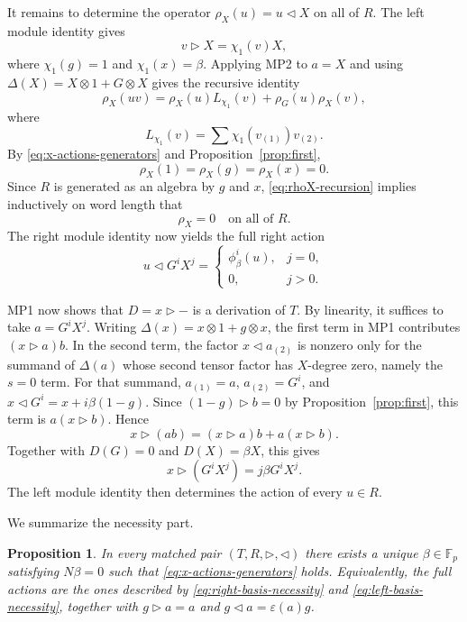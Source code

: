 \documentclass[twoside,11pt]{amsart}
\newtheorem{pro}[defi]{Proposition}
\newcommand{\F}{\mathbb{F}}
\begin{document}
	It remains to determine the operator
	$\rho_X(u)=u\triangleleft X$ on all of $R$. The left module identity gives
	\[
	v\triangleright X=\chi_1(v)X,
	\]
	where $\chi_1(g)=1$ and $\chi_1(x)=\beta$. Applying MP2 to $a=X$ and using
	$\Delta(X)=X\otimes1+G\otimes X$ gives the recursive identity
	\begin{equation}\label{eq:rhoX-recursion}
		\rho_X(uv)
		=\rho_X(u)L_{\chi_1}(v)+\rho_G(u)\rho_X(v),
	\end{equation}
	where
	\[
	L_{\chi_1}(v)=\sum\chi_1(v_{(1)})v_{(2)}.
	\]
	By \eqref{eq:x-actions-generators} and Proposition~\ref{prop:first},
	\[
	\rho_X(1)=\rho_X(g)=\rho_X(x)=0.
	\]
	Since $R$ is generated as an algebra by $g$ and $x$,
	\eqref{eq:rhoX-recursion} implies inductively on word length that
	\begin{equation}\label{eq:rhoX-zero}
		\rho_X=0
		\quad\text{on all of }R.
	\end{equation}
	The right module identity now yields the full right action
	\begin{equation}\label{eq:right-basis-necessity}
		u\triangleleft G^iX^j=
		\begin{cases}
			\phi_\beta^i(u),&j=0,\\
			0,&j>0.
		\end{cases}
	\end{equation}
	
	MP1 now shows that $D=x\triangleright-$ is a derivation of $T$. By
	linearity, it suffices to take $a=G^iX^j$. Writing
	$\Delta(x)=x\otimes1+g\otimes x$, the first term in MP1 contributes
	$(x\triangleright a)b$. In the second term, the factor
	$x\triangleleft a_{(2)}$ is nonzero only for the summand of $\Delta(a)$ whose
	second tensor factor has $X$-degree zero, namely the $s=0$ term. For that
	summand, $a_{(1)}=a$, $a_{(2)}=G^i$, and
	$x\triangleleft G^i=x+i\beta(1-g)$. Since
	$(1-g)\triangleright b=0$ by Proposition~\ref{prop:first}, this term is
	$a(x\triangleright b)$. Hence
	\[
	x\triangleright(ab)
	=(x\triangleright a)b+a(x\triangleright b).
	\]
	Together with $D(G)=0$ and $D(X)=\beta X$, this gives
	\begin{equation}\label{eq:left-basis-necessity}
		x\triangleright(G^iX^j)=j\beta G^iX^j.
	\end{equation}
	The left module identity then determines the action of every $u\in R$.
	
	We summarize the necessity part.
	
	\begin{pro}\label{prop:second}
		In every matched pair $(T,R,\triangleright,\triangleleft)$ there exists a
		unique $\beta\in\F_p$ satisfying $N\beta=0$ such that
		\eqref{eq:x-actions-generators} holds. Equivalently, the full actions are the
		ones described by \eqref{eq:right-basis-necessity} and
		\eqref{eq:left-basis-necessity}, together with
		$g\triangleright a=a$ and $g\triangleleft a=\varepsilon(a)g$.
	\end{pro}
	
\end{document}
